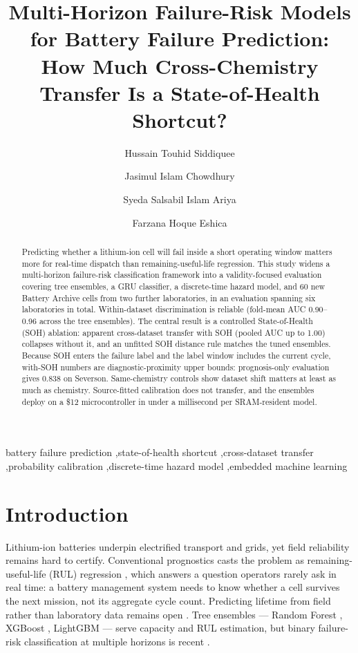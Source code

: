 \documentclass[preprint,12pt]{elsarticle}
\begin{document}
\begin{frontmatter}
\title{Multi-Horizon Failure-Risk Models for Battery Failure Prediction: How Much Cross-Chemistry Transfer Is a State-of-Health Shortcut?}
\author[1]{Hussain Touhid Siddiquee}
\author[1]{Jasimul Islam Chowdhury}
\author[1]{Syeda Salsabil Islam Ariya}
\author[1]{Farzana Hoque Eshica}
\address[1]{Leading University, Sylhet 3100, Bangladesh}
\begin{abstract}
Predicting whether a lithium-ion cell will fail inside a short operating window matters more for real-time dispatch than remaining-useful-life regression. This study widens a multi-horizon failure-risk classification framework into a validity-focused evaluation covering tree ensembles, a GRU classifier, a discrete-time hazard model, and 60 new Battery Archive cells from two further laboratories, in an evaluation spanning six laboratories in total. Within-dataset discrimination is reliable (fold-mean AUC 0.90--0.96 across the tree ensembles). The central result is a controlled State-of-Health (SOH) ablation: apparent cross-dataset transfer with SOH (pooled AUC up to 1.00) collapses without it, and an unfitted SOH distance rule matches the tuned ensembles. Because SOH enters the failure label and the label window includes the current cycle, with-SOH numbers are diagnostic-proximity upper bounds: prognosis-only evaluation gives 0.838 on Severson. Same-chemistry controls show dataset shift matters at least as much as chemistry. Source-fitted calibration does not transfer, and the ensembles deploy on a \$12 microcontroller in under a millisecond per SRAM-resident model.
\end{abstract}
\begin{keyword}
battery failure prediction \sep state-of-health shortcut \sep cross-dataset transfer \sep probability calibration \sep discrete-time hazard model \sep embedded machine learning
\end{keyword}
\end{frontmatter}

\section{Introduction}
Lithium-ion batteries underpin electrified transport and grids, yet field reliability remains hard to certify. Conventional prognostics casts the problem as remaining-useful-life (RUL) regression \cite{meng2019review,roman2021machine}, which answers a question operators rarely ask in real time: a battery management system needs to know whether a cell survives the next mission, not its aggregate cycle count. Predicting lifetime from field rather than laboratory data remains open \cite{sulzer2021challenge}. Tree ensembles --- Random Forest \cite{breiman2001random}, XGBoost \cite{chen2016xgboost}, LightGBM \cite{ke2017lightgbm} --- serve capacity and RUL estimation, but binary failure-risk classification at multiple horizons is recent \cite{shikdar2026learning}.
\end{document}
